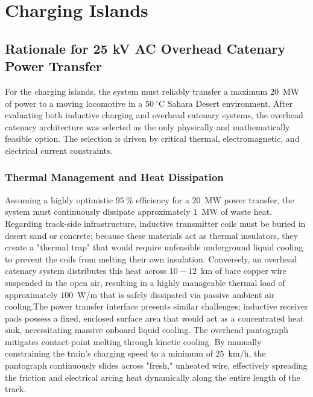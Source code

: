 \section{Charging Islands}\label{sec:charging_islands}






\subsection{Rationale for 25 kV AC Overhead Catenary Power Transfer}For the charging islands, the system must reliably transfer a maximum $20$~MW of power to a moving locomotive in a $50~^\circ$C Sahara Desert environment. After evaluating both inductive charging and overhead catenary systems, the overhead catenary architecture was selected as the only physically and mathematically feasible option. The selection is driven by critical thermal, electromagnetic, and electrical current constraints.
\subsubsection*{Thermal Management and Heat Dissipation}Assuming a highly optimistic $95~\%$ efficiency for a $20$~MW power transfer, the system must continuously dissipate approximately $1$~MW of waste heat. Regarding track-side infrastructure, inductive transmitter coils must be buried in desert sand or concrete; because these materials act as thermal insulators, they create a "thermal trap" that would require unfeasible underground liquid cooling to prevent the coils from melting their own insulation. Conversely, an overhead catenary system distributes this heat across $10-12$~km of bare copper wire suspended in the open air, resulting in a highly manageable thermal load of approximately $100$~W/m that is safely dissipated via passive ambient air cooling.The power transfer interface presents similar challenges; inductive receiver pads possess a fixed, enclosed surface area that would act as a concentrated heat sink, necessitating massive onboard liquid cooling. The overhead pantograph mitigates contact-point melting through kinetic cooling. By manually constraining the train’s charging speed to a minimum of $25$~km/h, the pantograph continuously slides across "fresh," unheated wire, effectively spreading the friction and electrical arcing heat dynamically along the entire length of the track.
